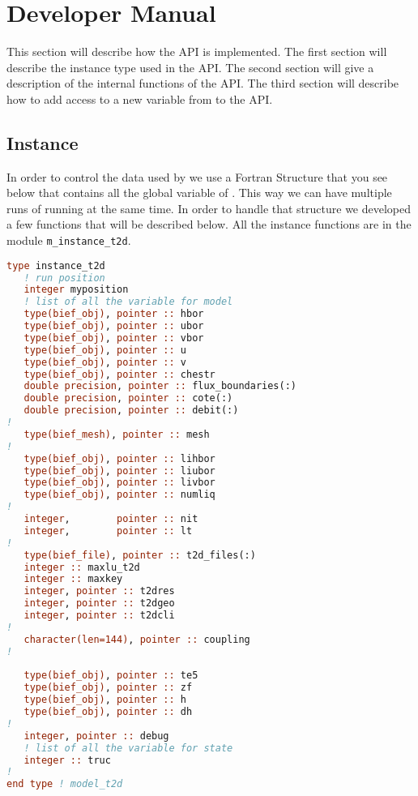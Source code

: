 %
\section{Developer Manual}
%
This section will describe how the API is implemented. The first section will
describe the instance type used in the API. The second section will give a
description of the internal functions of the API. The third section will
describe how to add access to a new variable from  to the API.
%
\subsection{Instance}
%
In order to control the data used by  we use a Fortran Structure that you
see below that contains all the global variable of . This way we can have
multiple runs of  running at the same time. In order to handle that
structure we developed a few functions that will be described below. All the
instance functions are in the module \verb!m_instance_t2d!.

\begin{lstlisting}[language=Fortran]
type instance_t2d
   ! run position
   integer myposition
   ! list of all the variable for model
   type(bief_obj), pointer :: hbor
   type(bief_obj), pointer :: ubor
   type(bief_obj), pointer :: vbor
   type(bief_obj), pointer :: u
   type(bief_obj), pointer :: v
   type(bief_obj), pointer :: chestr
   double precision, pointer :: flux_boundaries(:)
   double precision, pointer :: cote(:)
   double precision, pointer :: debit(:)
!
   type(bief_mesh), pointer :: mesh
!
   type(bief_obj), pointer :: lihbor
   type(bief_obj), pointer :: liubor
   type(bief_obj), pointer :: livbor
   type(bief_obj), pointer :: numliq
!
   integer,        pointer :: nit
   integer,        pointer :: lt
!
   type(bief_file), pointer :: t2d_files(:)
   integer :: maxlu_t2d
   integer :: maxkey 
   integer, pointer :: t2dres
   integer, pointer :: t2dgeo
   integer, pointer :: t2dcli
!
   character(len=144), pointer :: coupling
!
 
   type(bief_obj), pointer :: te5
   type(bief_obj), pointer :: zf
   type(bief_obj), pointer :: h
   type(bief_obj), pointer :: dh
!
   integer, pointer :: debug
   ! list of all the variable for state
   integer :: truc
!
end type ! model_t2d
\end{lstlisting}

